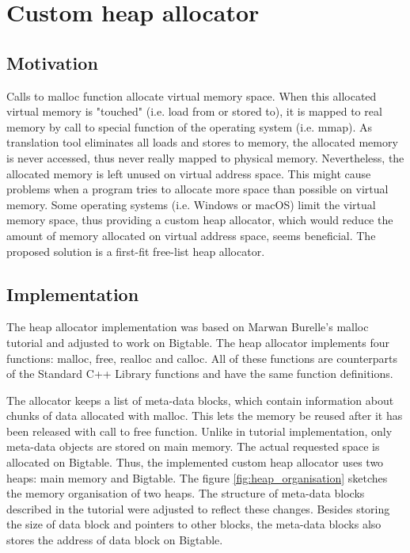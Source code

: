 \documentclass[bsc,frontabs,twoside,singlespacing,parskip,deptreport]{infthesis}     %
\begin{document}
\chapter{Custom heap allocator}

\section{Motivation}

Calls to malloc function allocate virtual memory space. When this allocated virtual memory is "touched" (i.e. load from or stored to), it is mapped to real memory by call to special function of the operating system (i.e. mmap). As translation tool eliminates all loads and stores to memory, the allocated memory is never accessed, thus never really mapped to physical memory. Nevertheless, the allocated memory is left unused on virtual address space. This might cause problems when a program tries to allocate more space than possible on virtual memory. Some operating systems (i.e. Windows or macOS) limit the virtual memory space, thus providing a custom heap allocator, which would reduce the amount of memory allocated on virtual address space, seems beneficial. The proposed solution is a first-fit free-list heap allocator.

\section{Implementation}

The heap allocator implementation was based on Marwan Burelle's malloc tutorial \citep{malloc_tutorial} and adjusted to work on Bigtable. The heap allocator implements four functions: malloc, free, realloc and calloc. All of these functions are counterparts of the Standard C++ Library functions and have the same function definitions.

The allocator keeps a list of meta-data blocks, which contain information about chunks of data allocated with malloc. This lets the memory be reused after it has been released with call to free function. Unlike in tutorial implementation, only meta-data objects are stored on main memory. The actual requested space is allocated on Bigtable. Thus, the implemented custom heap allocator uses two heaps: main memory and Bigtable. The figure \ref{fig:heap_organisation} sketches the memory organisation of two heaps. The structure of meta-data blocks described in the tutorial were adjusted to reflect these changes. Besides storing the size of data block and pointers to other blocks, the meta-data blocks also stores the address of data block on Bigtable.
\end{document}
